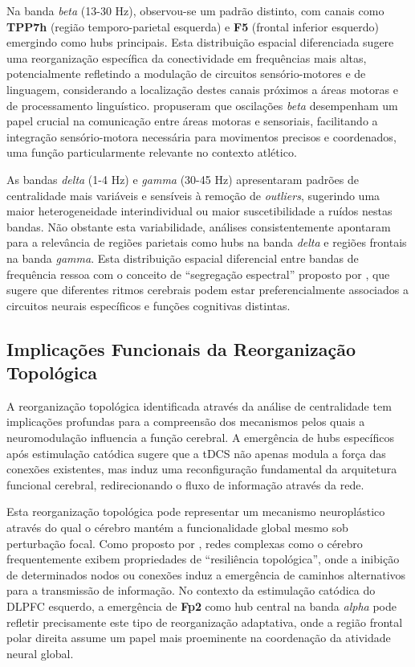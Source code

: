 Na banda \emph{beta} (13-30 Hz), observou-se um padrão distinto, com canais como \textbf{TPP7h} (região temporo-parietal esquerda) e \textbf{F5} (frontal inferior esquerdo) emergindo como hubs principais. Esta distribuição espacial diferenciada sugere uma reorganização específica da conectividade em frequências mais altas, potencialmente refletindo a modulação de circuitos sensório-motores e de linguagem, considerando a localização destes canais próximos a áreas motoras e de processamento linguístico. \cite{fries2015rhythms} propuseram que oscilações \emph{beta} desempenham um papel crucial na comunicação entre áreas motoras e sensoriais, facilitando a integração sensório-motora necessária para movimentos precisos e coordenados, uma função particularmente relevante no contexto atlético.

As bandas \emph{delta} (1-4 Hz) e \emph{gamma} (30-45 Hz) apresentaram padrões de centralidade mais variáveis e sensíveis à remoção de \textit{outliers}, sugerindo uma maior heterogeneidade interindividual ou maior suscetibilidade a ruídos nestas bandas. Não obstante esta variabilidade, análises consistentemente apontaram para a relevância de regiões parietais como hubs na banda \emph{delta} e regiões frontais na banda \emph{gamma}. Esta distribuição espacial diferencial entre bandas de frequência ressoa com o conceito de ``segregação espectral'' proposto por \cite{siegel2012spectral}, que sugere que diferentes ritmos cerebrais podem estar preferencialmente associados a circuitos neurais específicos e funções cognitivas distintas.

\subsection{Implicações Funcionais da Reorganização Topológica}
A reorganização topológica identificada através da análise de centralidade tem implicações profundas para a compreensão dos mecanismos pelos quais a neuromodulação influencia a função cerebral. A emergência de hubs específicos após estimulação catódica sugere que a tDCS não apenas modula a força das conexões existentes, mas induz uma reconfiguração fundamental da arquitetura funcional cerebral, redirecionando o fluxo de informação através da rede.

Esta reorganização topológica pode representar um mecanismo neuroplástico através do qual o cérebro mantém a funcionalidade global mesmo sob perturbação focal. Como proposto por \cite{bullmore2009complex}, redes complexas como o cérebro frequentemente exibem propriedades de ``resiliência topológica'', onde a inibição de determinados nodos ou conexões induz a emergência de caminhos alternativos para a transmissão de informação. No contexto da estimulação catódica do DLPFC esquerdo, a emergência de \textbf{Fp2} como hub central na banda \emph{alpha} pode refletir precisamente este tipo de reorganização adaptativa, onde a região frontal polar direita assume um papel mais proeminente na coordenação da atividade neural global.

